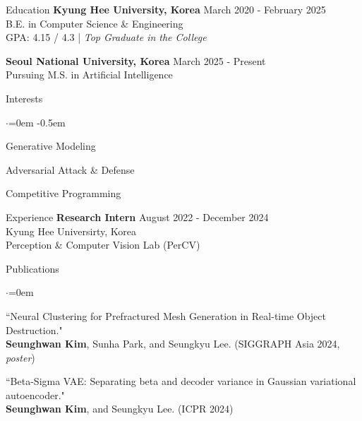 \documentclass{resume}
\begin{document}
\begin{rSection}{Education}
  {\bf Kyung Hee University, Korea } \hfill {March 2020 - February 2025} \\
  { B.E. in Computer Science \& Engineering} \\
  { GPA: 4.15 / 4.3 | \it Top Graduate in the College}

  {\bf Seoul National University, Korea } \hfill {March 2025 - Present} \\
  { Pursuing M.S. in Artificial Intelligence }
\end{rSection}

\begin{rSection}{Interests}
  \begin{list}{$\cdot$}{\leftmargin=0em}
    \itemsep -0.5em
    \item Generative Modeling
    \item Adversarial Attack \& Defense
    \item Competitive Programming
  \end{list}
\end{rSection}

\begin{rSection}{Experience}
  {\bf Research Intern } \hfill {August 2022 - December 2024} \\
  { Kyung Hee Universirty, Korea } \\
  { Perception \& Computer Vision Lab (PerCV) }
\end{rSection}

\begin{rSection}{Publications}
  \begin{list}{$\cdot$}{\leftmargin=0em}
    \item ``Neural Clustering for Prefractured Mesh Generation in Real-time Object Destruction." \\ {\bf Seunghwan Kim}, Sunha Park, and Seungkyu Lee. (SIGGRAPH Asia 2024, {\it poster})
    \item ``Beta-Sigma VAE: Separating beta and decoder variance in Gaussian variational autoencoder." \\ {\bf Seunghwan Kim}, and Seungkyu Lee. (ICPR 2024)
  \end{list}
\end{rSection}
\end{document}
